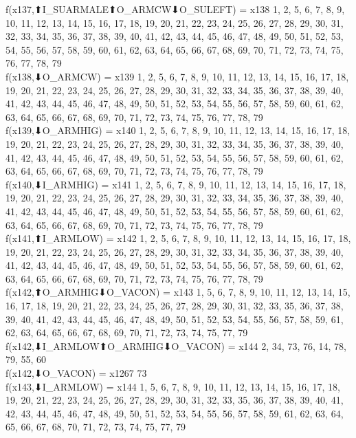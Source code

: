 f(x137,⬆I_SUARMALE⬆O_ARMCW⬇O_SULEFT) = x138 {1, 2, 5, 6, 7, 8, 9, 10, 11, 12, 13, 14, 15, 16, 17, 18, 19, 20, 21, 22, 23, 24, 25, 26, 27, 28, 29, 30, 31, 32, 33, 34, 35, 36, 37, 38, 39, 40, 41, 42, 43, 44, 45, 46, 47, 48, 49, 50, 51, 52, 53, 54, 55, 56, 57, 58, 59, 60, 61, 62, 63, 64, 65, 66, 67, 68, 69, 70, 71, 72, 73, 74, 75, 76, 77, 78, 79} \\
f(x138,⬇O_ARMCW) = x139 {1, 2, 5, 6, 7, 8, 9, 10, 11, 12, 13, 14, 15, 16, 17, 18, 19, 20, 21, 22, 23, 24, 25, 26, 27, 28, 29, 30, 31, 32, 33, 34, 35, 36, 37, 38, 39, 40, 41, 42, 43, 44, 45, 46, 47, 48, 49, 50, 51, 52, 53, 54, 55, 56, 57, 58, 59, 60, 61, 62, 63, 64, 65, 66, 67, 68, 69, 70, 71, 72, 73, 74, 75, 76, 77, 78, 79} \\
f(x139,⬇O_ARMHIG) = x140 {1, 2, 5, 6, 7, 8, 9, 10, 11, 12, 13, 14, 15, 16, 17, 18, 19, 20, 21, 22, 23, 24, 25, 26, 27, 28, 29, 30, 31, 32, 33, 34, 35, 36, 37, 38, 39, 40, 41, 42, 43, 44, 45, 46, 47, 48, 49, 50, 51, 52, 53, 54, 55, 56, 57, 58, 59, 60, 61, 62, 63, 64, 65, 66, 67, 68, 69, 70, 71, 72, 73, 74, 75, 76, 77, 78, 79} \\
f(x140,⬇I_ARMHIG) = x141 {1, 2, 5, 6, 7, 8, 9, 10, 11, 12, 13, 14, 15, 16, 17, 18, 19, 20, 21, 22, 23, 24, 25, 26, 27, 28, 29, 30, 31, 32, 33, 34, 35, 36, 37, 38, 39, 40, 41, 42, 43, 44, 45, 46, 47, 48, 49, 50, 51, 52, 53, 54, 55, 56, 57, 58, 59, 60, 61, 62, 63, 64, 65, 66, 67, 68, 69, 70, 71, 72, 73, 74, 75, 76, 77, 78, 79} \\
f(x141,⬆I_ARMLOW) = x142 {1, 2, 5, 6, 7, 8, 9, 10, 11, 12, 13, 14, 15, 16, 17, 18, 19, 20, 21, 22, 23, 24, 25, 26, 27, 28, 29, 30, 31, 32, 33, 34, 35, 36, 37, 38, 39, 40, 41, 42, 43, 44, 45, 46, 47, 48, 49, 50, 51, 52, 53, 54, 55, 56, 57, 58, 59, 60, 61, 62, 63, 64, 65, 66, 67, 68, 69, 70, 71, 72, 73, 74, 75, 76, 77, 78, 79} \\
f(x142,⬆O_ARMHIG⬇O_VACON) = x143 {1, 5, 6, 7, 8, 9, 10, 11, 12, 13, 14, 15, 16, 17, 18, 19, 20, 21, 22, 23, 24, 25, 26, 27, 28, 29, 30, 31, 32, 33, 35, 36, 37, 38, 39, 40, 41, 42, 43, 44, 45, 46, 47, 48, 49, 50, 51, 52, 53, 54, 55, 56, 57, 58, 59, 61, 62, 63, 64, 65, 66, 67, 68, 69, 70, 71, 72, 73, 74, 75, 77, 79} \\
f(x142,⬇I_ARMLOW⬆O_ARMHIG⬇O_VACON) = x144 {2, 34, 73, 76, 14, 78, 79, 55, 60} \\
f(x142,⬇O_VACON) = x1267 {73} \\
f(x143,⬇I_ARMLOW) = x144 {1, 5, 6, 7, 8, 9, 10, 11, 12, 13, 14, 15, 16, 17, 18, 19, 20, 21, 22, 23, 24, 25, 26, 27, 28, 29, 30, 31, 32, 33, 35, 36, 37, 38, 39, 40, 41, 42, 43, 44, 45, 46, 47, 48, 49, 50, 51, 52, 53, 54, 55, 56, 57, 58, 59, 61, 62, 63, 64, 65, 66, 67, 68, 70, 71, 72, 73, 74, 75, 77, 79} \\
